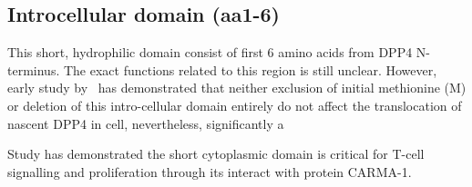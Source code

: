 \subsection{Introcellular domain (aa1-6)}

This short, hydrophilic domain consist of first 6 amino acids from DPP4 N-terminus. The exact functions related to this region is still unclear. However, early study by~\citet{Hong1990} has demonstrated that neither exclusion of initial methionine (M) or deletion of this intro-cellular domain entirely do not affect the translocation of nascent DPP4 in cell, nevertheless, significantly a

Study has demonstrated the short cytoplasmic domain is critical for T-cell signalling and proliferation through its interact with protein CARMA-1. \cite{Ohnuma_2007}